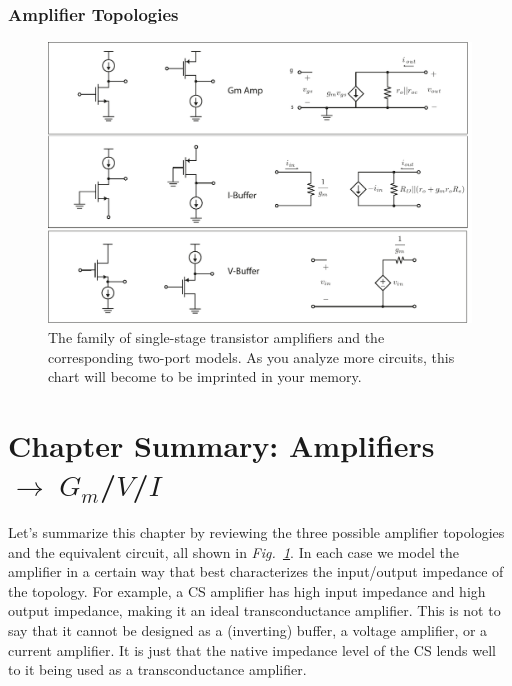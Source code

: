 \subsubsection{Amplifier Topologies}
\begin{figure}[H]
\centering
\includegraphics[width=\columnwidth]{ampchart_models}
\caption{The family of single-stage transistor amplifiers and the corresponding two-port models.  As you analyze more circuits, this chart will become to be imprinted in your memory.}
\label{fig:ampchart_models}
\end{figure}
\newpage
\section{Chapter Summary: Amplifiers \texorpdfstring{$\rightarrow \; G_m$/$V$/$I$}{}}
Let's summarize this chapter by reviewing the three possible amplifier topologies and the equivalent circuit, all shown in \emph{Fig.~\ref{fig:ampchart_models}}.  In each case we model the amplifier in a certain way that best characterizes the input/output impedance of the topology.  For example, a CS amplifier has high input impedance and high output impedance, making it an ideal transconductance amplifier.  This is not to say that it cannot be designed as a (inverting) buffer, a voltage amplifier, or a current amplifier.  It is just that the native impedance level of the CS lends well to it being used as a transconductance amplifier.  

